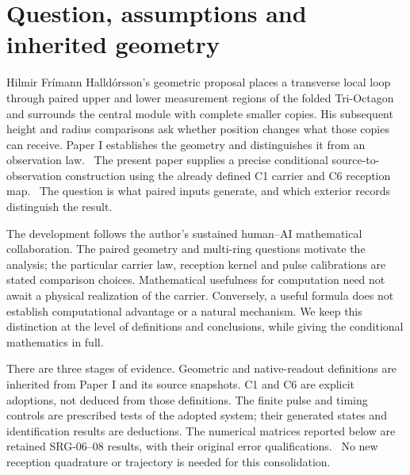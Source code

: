 \section{Question, assumptions and inherited geometry}\label{sec:foundations}
Hilmir Fr\'imann Halld\'orsson's geometric proposal places a transverse local loop through paired upper and lower measurement regions of the folded Tri-Octagon and surrounds the central module with complete smaller copies. His subsequent height and radius comparisons ask whether position changes what those copies can receive. Paper I establishes the geometry and distinguishes it from an observation law.~\cite{PaperI} The present paper supplies a precise conditional source-to-observation construction using the already defined C1 carrier and C6 reception map.~\cite{SRG05,SRG06} The question is what paired inputs generate, and which exterior records distinguish the result.

The development follows the author's sustained human--AI mathematical collaboration. The paired geometry and multi-ring questions motivate the analysis; the particular carrier law, reception kernel and pulse calibrations are stated comparison choices. Mathematical usefulness for computation need not await a physical realization of the carrier. Conversely, a useful formula does not establish computational advantage or a natural mechanism. We keep this distinction at the level of definitions and conclusions, while giving the conditional mathematics in full.

There are three stages of evidence. Geometric and native-readout definitions are inherited from Paper I and its source snapshots. C1 and C6 are explicit adoptions, not deduced from those definitions. The finite pulse and timing controls are prescribed tests of the adopted system; their generated states and identification results are deductions. The numerical matrices reported below are retained SRG-06--08 results, with their original error qualifications.~\cite{SRG07,SRG08,Reviews} No new reception quadrature or trajectory is needed for this consolidation.

